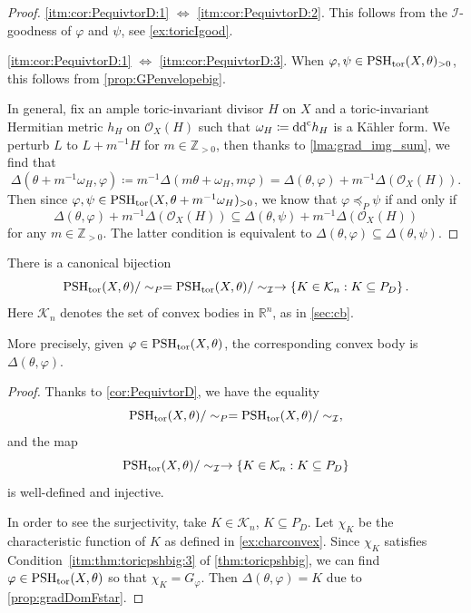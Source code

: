 \begin{proof}
    \ref{itm:cor:PequivtorD:1} $\iff$ \ref{itm:cor:PequivtorD:2}. This follows from the $\mathcal{I}$-goodness of $\varphi$ and $\psi$, see \cref{ex:toricIgood}.

    \ref{itm:cor:PequivtorD:1} $\iff$ \ref{itm:cor:PequivtorD:3}. When $\varphi,\psi\in \mathrm{PSH}_{\mathrm{tor}}(X,\theta)_{>0}$, this follows from \cref{prop:GPenvelopebig}.

    In general, fix an ample toric-invariant divisor $H$ on $X$ and a toric-invariant Hermitian metric $h_H$ on $\mathcal{O}_X(H)$ such that $\omega_H\coloneqq \mathrm{dd}^{\mathrm{c}} h_H$ is a Kähler form. We perturb $L$ to $L+m^{-1}H$ for $m\in \mathbb{Z}_{>0}$, then thanks to \cref{lma:grad_img_sum}, we find that
    \[
    \Delta(\theta+m^{-1}\omega_H,\varphi)\coloneqq m^{-1}\Delta(m\theta+\omega_H,m\varphi)=\Delta(\theta,\varphi)+m^{-1}\Delta\left(\mathcal{O}_X(H)\right).
    \]
    Then since $\varphi,\psi\in \mathrm{PSH}_{\mathrm{tor}}(X,\theta+m^{-1}\omega_H)_{>0}$, we know that $\varphi\preceq_P \psi$ if and only if
    \[
    \Delta(\theta,\varphi)+m^{-1}\Delta\left(\mathcal{O}_X(H)\right)\subseteq \Delta(\theta,\psi)+m^{-1}\Delta\left(\mathcal{O}_X(H)\right)
    \]
    for any $m\in \mathbb{Z}_{>0}$. The latter condition is equivalent to $\Delta(\theta,\varphi)\subseteq \Delta(\theta,\psi)$.
\end{proof}
\begin{corollary}\label{cor:bij_conv_torpsh}
    There is a canonical bijection
    \[
    \mathrm{PSH}_{\mathrm{tor}}(X,\theta)/\sim_{P}=\mathrm{PSH}_{\mathrm{tor}}(X,\theta)/\sim_{\mathcal{I}}\rightarrow \left\{K\in \mathcal{K}_n: K \subseteq P_D \right\}.
    \]
    Here $\mathcal{K}_n$ denotes the set of convex bodies in $\mathbb{R}^n$, as in \cref{sec:cb}.
\end{corollary}
More precisely, given $\varphi\in \mathrm{PSH}_{\mathrm{tor}}(X,\theta)$, the corresponding convex body is $\Delta(\theta,\varphi)$.

\begin{proof}
    Thanks to \cref{cor:PequivtorD}, we have the equality
    \[
    \mathrm{PSH}_{\mathrm{tor}}(X,\theta)/\sim_{P}=\mathrm{PSH}_{\mathrm{tor}}(X,\theta)/\sim_{\mathcal{I}},
    \]
    and the map
    \[
    \mathrm{PSH}_{\mathrm{tor}}(X,\theta)/\sim_{\mathcal{I}}\rightarrow \left\{K\in \mathcal{K}_n: K \subseteq P_D \right\}
    \]
    is well-defined and injective.

    In order to see the surjectivity, take $K\in \mathcal{K}_n$, $K\subseteq P_D$. Let $\chi_K$ be the characteristic function of $K$ as defined in \cref{ex:charconvex}. Since $\chi_K$ satisfies Condition~\ref{itm:thm:toricpshbig:3} of \cref{thm:toricpshbig}, we can find $\varphi\in \mathrm{PSH}_{\mathrm{tor}}(X,\theta)$ so that $\chi_K=G_{\varphi}$. Then $\Delta(\theta,\varphi)=K$ due to \cref{prop:gradDomFstar}.
\end{proof}

